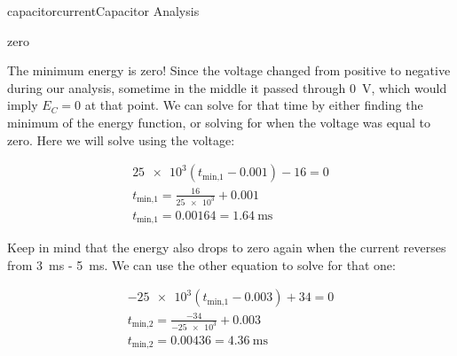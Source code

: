 \begin{mainquestion}{capacitorcurrent}{Capacitor Analysis}
\begin{partquestion}{zero}
\begin{answer}
The minimum energy is zero! Since the voltage changed from positive to negative during our analysis, sometime in the middle it passed through \qty{0}{\volt}, which would imply $E_C = 0$ at that point. We can solve for that time by either finding the minimum of the energy function, or solving for when the voltage was equal to zero. Here we will solve using the voltage:

\begin{gather*}
\num{25e3} (t_{\text{min,1}} - 0.001) - 16 = 0 \\
t_{\text{min,1}} = \frac{16}{\num{25e3}} + 0.001 \\
t_{\text{min,1}} = 0.00164 = \qty{1.64}{\milli\second}
\end{gather*}

Keep in mind that the energy also drops to zero again when the current reverses from \qty{3}{\milli\second} - \qty{5}{\milli\second}. We can use the other equation to solve for that one:

\begin{gather*}
-\num{25e3} (t_{\text{min,1}} - 0.003) + 34 = 0 \\
t_{\text{min,2}} = \frac{-34}{\num{-25e3}} + 0.003 \\
t_{\text{min,2}} = 0.00436 = \qty{4.36}{\milli\second}
\end{gather*}

\end{answer}
\end{partquestion}


\end{mainquestion}
